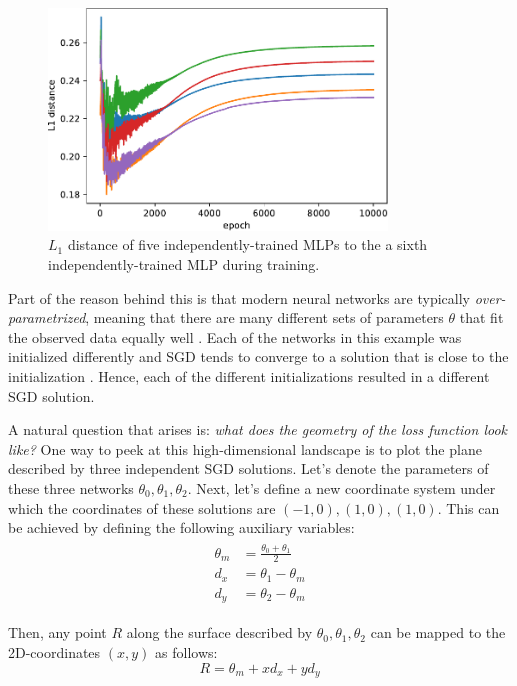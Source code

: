 \documentclass[12pt]{article}
\begin{document}
\begin{figure}[H]
\centering
\includegraphics[width=9cm]{plots/1d_ens_param_distance.pdf}
\caption{$L_1$ distance of five independently-trained MLPs to the a sixth independently-trained MLP during training.}
\label{fig_1d_ens_param_distance}
\end{figure}

Part of the reason behind this is that modern neural networks are typically \textit{over-parametrized}, meaning that there are many different sets of parameters $\theta$ that fit the observed data equally well \cite{underspecification, deep_ens, mode_connectivity}. Each of the networks in this example was initialized differently and SGD tends to converge to a solution that is close to the initialization \cite{knowledge_distillation}. Hence, each of the different initializations resulted in a different SGD solution.

A natural question that arises is: \textit{what does the geometry of the loss function look like?} One way to peek at this high-dimensional landscape is to plot the plane described by three independent SGD solutions. Let's denote the parameters of these three networks $\theta_0, \theta_1, \theta_2$. Next, let's define a new coordinate system under which the coordinates of these solutions are $(-1, 0), (1, 0), (1, 0)$. This can be achieved by defining the following auxiliary variables:
\begin{align}
\begin{split}
\theta_m &= \frac{\theta_0 + \theta_1}{2} \\
d_x &= \theta_1 - \theta_m \\
d_y &= \theta_2 - \theta_m
\end{split}
\end{align}

Then, any point $R$ along the surface described by $\theta_0, \theta_1, \theta_2$ can be mapped to the 2D-coordinates $(x, y)$ as follows:
\begin{equation}
R = \theta_m + x d_x + y d_y
\end{equation}
\end{document}
